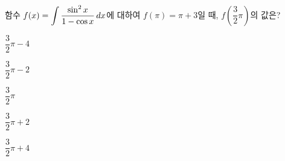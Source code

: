 함수 $f(x)=\displaystyle\int \dfrac{\sin^2 x}{1-\cos x}\mkern3mu dx$에 대하여 $f(\pi)=\pi+3$일 때, $f\left(\dfrac{3}{2}\pi\right)$의 값은?
\begin{choices32}{\rule[-3ex]{0pt}{8ex}$\dfrac{3}{2}\pi-4$}{\rule[-3ex]{0pt}{8ex}$\dfrac{3}{2}\pi-2$}{\rule[-3ex]{0pt}{8ex}$\dfrac{3}{2}\pi$}{\rule[-3ex]{0pt}{8ex}$\dfrac{3}{2}\pi+2$}{\rule[-3ex]{0pt}{8ex}$\dfrac{3}{2}\pi+4$}\end{choices32}
